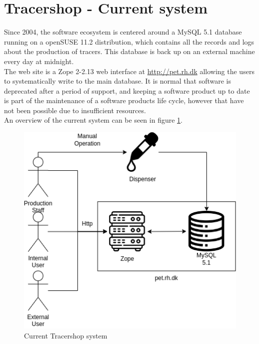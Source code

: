 \documentclass{article}
\begin{document}
\section*{Tracershop - Current system}
Since 2004, the software ecosystem is centered around a MySQL 5.1 database running on a openSUSE 11.2 distribution, which contains all the records and logs about the production of tracers. 
This database is back up on an external machine every day at midnight.\\
The web site is a Zope 2-2.13 web interface at \url{http://pet.rh.dk} allowing the users to systematically write to the main database.
It is normal that software is deprecated after a period of support, and keeping a software product up to date is part of the maintenance of a software products life cycle,
however that have not been possible due to insufficient resources.\\
An overview of the current system can be seen in figure \ref{fig:oldsys}.
\begin{figure}[ht]
  \begin{center}
    \includegraphics[width=0.6\linewidth]{OldSetup.png}
    \caption{Current Tracershop system}
    \label{fig:oldsys}
  \end{center}
\end{figure}
\end{document}
